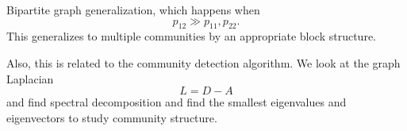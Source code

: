\begin{itemize}
	      \begin{remark}
		      Bipartite graph generalization, which happens when
		      \[
			      p_{12}\gg p_{11}, p_{22}.
		      \]
		      This generalizes to multiple communities by an appropriate block structure.

		      \begin{figure}[H]
			      \centering
			      \label{fig:bipartite-graph-generalization}
		      \end{figure}

		      Also, this is related to the community detection algorithm. We look at the graph Laplacian
		      \[
			      L = D - A
		      \]
		      and find spectral decomposition and find the smallest eigenvalues and eigenvectors to study community structure.
	      \end{remark}
\end{itemize}

